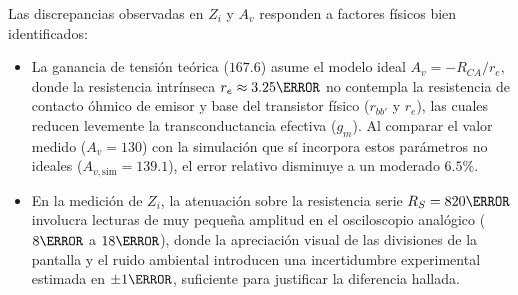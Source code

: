 Las discrepancias observadas en $Z_i$ y $A_v$ responden a factores físicos bien identificados:
\begin{itemize}
  \item La ganancia de tensión teórica ($167.6$) asume el modelo ideal $A_v = -R_{CA}/r_e$, donde la resistencia
    intrínseca $r_e \approx 3.25\ohm$ no contempla la resistencia de contacto óhmico de emisor y base del transistor
    físico ($r_{bb'}$ y $r_e$), las cuales reducen levemente la transconductancia efectiva ($g_m$). Al comparar el valor
    medido ($A_v = 130$) con la simulación que sí incorpora estos parámetros no ideales ($A_{v,\text{sim}} = 139.1$),
    el error relativo disminuye a un moderado $6.5\%$.
  \item En la medición de $Z_i$, la atenuación sobre la resistencia serie $R_S = 820\ohm$ involucra lecturas de muy
    pequeña amplitud en el osciloscopio analógico ($8\mV$ a $18\mV$), donde la apreciación visual de las divisiones de la
    pantalla y el ruido ambiental introducen una incertidumbre experimental estimada en $\pm 1\mV$, suficiente para
    justificar la diferencia hallada.
\end{itemize}
